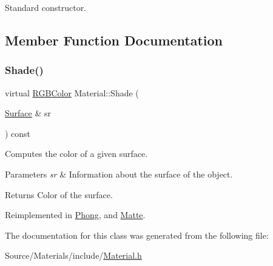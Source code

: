 Standard constructor. 

\subsection{Member Function Documentation}
\hypertarget{class_material_aeccd880ee7b86a849e8f2d2f0bcf4fc7}{}\label{class_material_aeccd880ee7b86a849e8f2d2f0bcf4fc7} 
\subsubsection{\texorpdfstring{Shade()}{Shade()}}
{\footnotesize\ttfamily virtual \hyperlink{class_r_g_b_color}{R\+G\+B\+Color} Material\+::\+Shade (\begin{DoxyParamCaption}\item[{\hyperlink{class_surface}{Surface} \&}]{sr }\end{DoxyParamCaption}) const\hspace{0.3cm}{\ttfamily [virtual]}}

Computes the color of a given surface. 
\begin{DoxyParams}{Parameters}
{\em sr} & Information about the surface of the object. \\
\hline
\end{DoxyParams}
\begin{DoxyReturn}{Returns}
Color of the surface. 
\end{DoxyReturn}


Reimplemented in \hyperlink{class_phong_a4ab7e1d4514c37abe47e18d627856dc8}{Phong}, and \hyperlink{class_matte_a1313aabd946d45ec67a9de4fbc486f6c}{Matte}.



The documentation for this class was generated from the following file\+:\begin{DoxyCompactItemize}
\item 
Source/\+Materials/include/\hyperlink{_material_8h}{Material.\+h}\end{DoxyCompactItemize}
